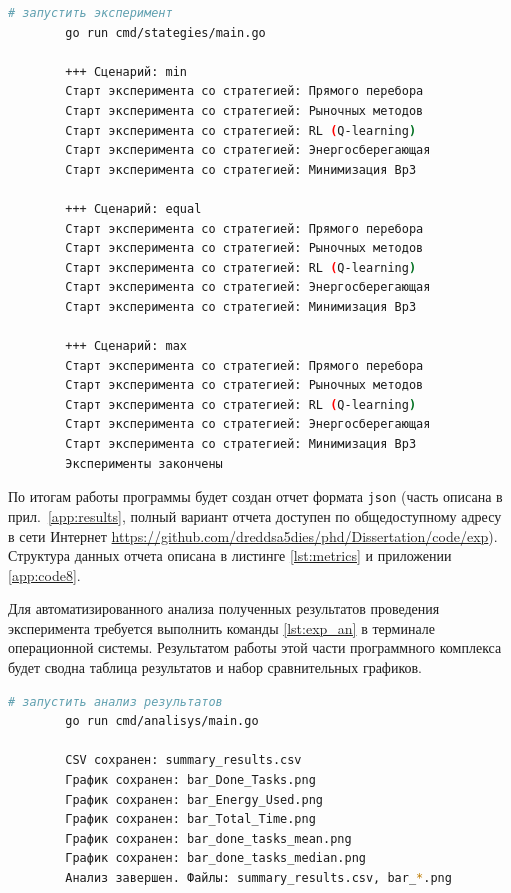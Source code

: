 \begin{ListingEnv}[ht!]
	\captiondelim{ }
	\caption{Порядок команд для запуска эксперимента}\label{lst:exp}
	\begin{lstlisting}[language=Bash]
		# запустить эксперимент
		go run cmd/stategies/main.go

		+++ Сценарий: min
		Старт эксперимента со стратегией: Прямого перебора
		Старт эксперимента со стратегией: Рыночных методов
		Старт эксперимента со стратегией: RL (Q-learning)
		Старт эксперимента со стратегией: Энергосберегающая
		Старт эксперимента со стратегией: Минимизация ВрЗ

		+++ Сценарий: equal
		Старт эксперимента со стратегией: Прямого перебора
		Старт эксперимента со стратегией: Рыночных методов
		Старт эксперимента со стратегией: RL (Q-learning)
		Старт эксперимента со стратегией: Энергосберегающая
		Старт эксперимента со стратегией: Минимизация ВрЗ

		+++ Сценарий: max
		Старт эксперимента со стратегией: Прямого перебора
		Старт эксперимента со стратегией: Рыночных методов
		Старт эксперимента со стратегией: RL (Q-learning)
		Старт эксперимента со стратегией: Энергосберегающая
		Старт эксперимента со стратегией: Минимизация ВрЗ
		Эксперименты закончены
	\end{lstlisting}
\end{ListingEnv}%

По итогам работы программы будет создан отчет формата \texttt{json} (часть описана в прил.~\ref{app:results}, полный вариант отчета доступен по общедоступному адресу в сети Интернет \url{https://github.com/dreddsa5dies/phd/Dissertation/code/exp}). Структура данных отчета описана в листинге \ref{lst:metrics} и приложении \ref{app:code8}.

Для автоматизированного анализа полученных результатов проведения эксперимента требуется выполнить команды \ref{lst:exp_an} в терминале операционной системы. Результатом работы этой части программного комплекса будет сводна таблица результатов и набор сравнительных графиков.

\begin{ListingEnv}[ht!]
	\captiondelim{ }
	\caption{Порядок команд для подготовки результатов эксперимента}\label{lst:exp_an}
	\begin{lstlisting}[language=Bash]
		# запустить анализ результатов
		go run cmd/analisys/main.go

		CSV сохранен: summary_results.csv
		График сохранен: bar_Done_Tasks.png
		График сохранен: bar_Energy_Used.png
		График сохранен: bar_Total_Time.png
		График сохранен: bar_done_tasks_mean.png
		График сохранен: bar_done_tasks_median.png
		Анализ завершен. Файлы: summary_results.csv, bar_*.png
	\end{lstlisting}
\end{ListingEnv}%

